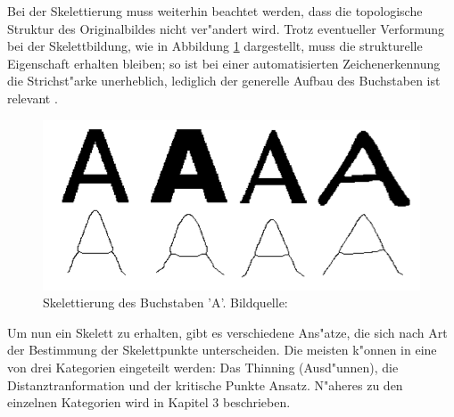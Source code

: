 Bei der Skelettierung muss weiterhin beachtet werden, dass die topologische Struktur des Originalbildes nicht ver"andert wird. Trotz eventueller Verformung bei der Skelettbildung, wie in Abbildung \ref{fig:topologischeStruktur} dargestellt, muss die strukturelle Eigenschaft erhalten bleiben; so ist bei einer automatisierten Zeichenerkennung die Strichst"arke unerheblich, lediglich der generelle Aufbau des Buchstaben ist relevant \cite{buhlmann}. \\
\begin{figure}
\centering
\includegraphics[width=0.7\linewidth]{./fig/topologischeStruktur}
\caption{Skelettierung des Buchstaben 'A'. Bildquelle:  \cite{buhlmann}}
\label{fig:topologischeStruktur}
\end{figure}


Um nun ein Skelett zu erhalten, gibt es verschiedene Ans"atze, die sich nach Art der Bestimmung der Skelettpunkte unterscheiden. Die meisten k"onnen in eine von drei Kategorien eingeteilt werden: Das Thinning (Ausd"unnen), die Distanztranformation und der kritische Punkte Ansatz. N"aheres zu den einzelnen Kategorien wird in Kapitel 3 beschrieben.


